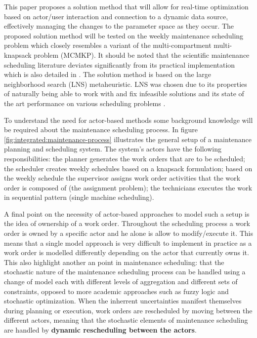 This paper proposes a solution method that will allow for real-time optimization
based on actor/user interaction and connection to a dynamic data source,
effectively managing the changes to the parameter space as they occur. The proposed solution
method will be tested on the weekly maintenance scheduling problem \citet{palmerMaintenancePlanningScheduling2019} 
which closely resembles a variant of the multi-compartment multi-knapsack problem (MCMKP). It
should be noted that the scientific maintenance scheduling literature deviates
significantly from its practical implementation which is also detailed in
\citep{palmerMaintenancePlanningScheduling2019}. The solution method is
based on the large neighborhood search (LNS) metaheuristic. LNS 
was chosen due to its properties of naturally being able to work with and fix
infeasible solutions and its state of the art performance on various scheduling
problems \citep{gendreauHandbookMetaheuristics2019}. 

To understand the need for actor-based methods some
background knowledge will be required about the maintenance scheduling process.
In figure \ref{fig:integrated:maintenance-process} illustrates the general setup
of a maintenance planning and scheduling system. The system's actors
have the following responsibilities: the planner generates the work orders that
are to be scheduled; the scheduler creates weekly schedules based on a knapsack
formulation; based on the weekly schedule the supervisor assigns work order
activities that the work order is composed of (the assignment problem); the
technicians executes the work in sequential pattern (single machine scheduling).

A final point on the necessity of actor-based approaches to model such a setup
is the idea of ownership of a work order. Throughout the scheduling process a
work order is owned by a specific actor and he alone is allow to modify/execute it. This
means that a single model approach is very difficult to implement in practice
as a work order is modelled differently depending on the actor that currently
owns it. This also highlight another an point in maintenance scheduling: that
the stochastic nature of the maintenance scheduling process can be handled using
a change of model each with different levels of aggregation and different sets
of constraints, opposed to more academic approaches such as fuzzy logic and
stochastic optimization. When the inherrent uncertainties manifest themselves
during planning or execution, work orders are rescheduled by moving between
the different actors, meaning that the stochastic elements of maintenance
scheduling are handled by \textbf{dynamic rescheduling between the actors}.

